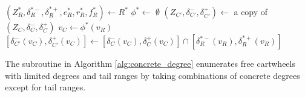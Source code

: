 \documentclass[main.tex]{subfiles}
\begin{document}
\begin{algorithm}
    \caption{\updateDegreeByRuleWithLink($(Z_C, \delta_C^-, \delta_C^+)$, $e$, $R^*$)}
    \label{alg:update_degree_by_rule}
    \begin{algorithmic}
        \State $(Z_R^*, \delta_R^{*-}, \delta_R^{*+}, e_R^*, r_R^*, f_R^*) \gets R^*$
        \State $\phi^* \gets$ 
            \State \Return $\emptyset$
        \EndIf
        \State $(Z_{C'}, \delta_{C'}^-, \delta_{C'}^+) \gets$ a copy of $(Z_C, \delta_C^-, \delta_C^+)$
            \State $v_C \gets \phi^*(v_R)$
            \State $[\delta_{C'}^-(v_C), \delta_{C'}^+(v_C)] \gets [\delta_C^-(v_C), \delta_C^+(v_C)] \cap [\delta_R^{*-}(v_R), \delta_R^{*+}(v_R)]$
        \EndFor
        \State \Return {}
    \end{algorithmic}
\end{algorithm}

The \concreteDegreesExceptTail subroutine in Algorithm \ref{alg:concrete_degree} enumerates free cartwheels with limited degrees and tail ranges by taking combinations of concrete degrees except for tail ranges.
\end{document}
